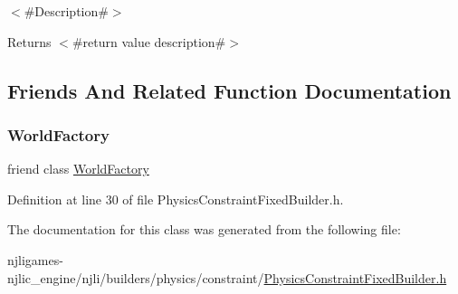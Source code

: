 $<$\#\+Description\#$>$

\begin{DoxyReturn}{Returns}
$<$\#return value description\#$>$ 
\end{DoxyReturn}


\subsection{Friends And Related Function Documentation}
\mbox{\label{classnjli_1_1_physics_constraint_fixed_builder_acb96ebb09abe8f2a37a915a842babfac}} 
\subsubsection{\texorpdfstring{World\+Factory}{WorldFactory}}
{\footnotesize\ttfamily friend class \mbox{\hyperlink{classnjli_1_1_world_factory}{World\+Factory}}\hspace{0.3cm}{\ttfamily [friend]}}



Definition at line 30 of file Physics\+Constraint\+Fixed\+Builder.\+h.



The documentation for this class was generated from the following file\+:\begin{DoxyCompactItemize}
\item 
njligames-\/njlic\+\_\+engine/njli/builders/physics/constraint/\mbox{\hyperlink{_physics_constraint_fixed_builder_8h}{Physics\+Constraint\+Fixed\+Builder.\+h}}\end{DoxyCompactItemize}
